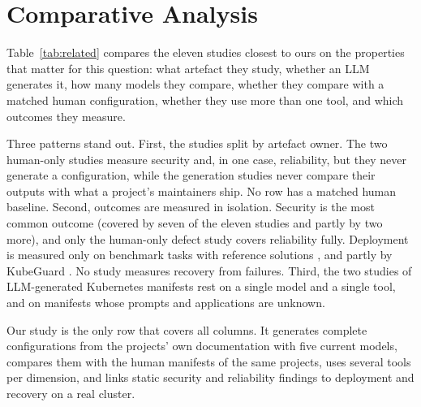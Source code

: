 \section{Comparative Analysis}\label{sec:comparative}

Table~\ref{tab:related} compares the eleven studies closest to ours on the properties that matter for this question: what artefact they study, whether an LLM generates it, how many models they compare, whether they compare with a matched human configuration, whether they use more than one tool, and which outcomes they measure.

Three patterns stand out. First, the studies split by artefact owner. The two human-only studies \citep{rahman2023k8smisconfig,zhang2026k8sconfigdefects} measure security and, in one case, reliability, but they never generate a configuration, while the generation studies never compare their outputs with what a project's maintainers ship. No row has a matched human baseline. Second, outcomes are measured in isolation. Security is the most common outcome (covered by seven of the eleven studies and partly by two more), and only the human-only defect study covers reliability fully. Deployment is measured only on benchmark tasks with reference solutions \citep{xu2024cloudevalyaml,zhang2026iacgen,ding2026fdebench}, and partly by KubeGuard \citep{sgancohen2025kubeguard}. No study measures recovery from failures. Third, the two studies of LLM-generated Kubernetes manifests \citep{zhang2024genaismells,jcomsec2026aivshumank8s} rest on a single model and a single tool, and on manifests whose prompts and applications are unknown.

Our study is the only row that covers all columns. It generates complete configurations from the projects' own documentation with five current models, compares them with the human manifests of the same projects, uses several tools per dimension, and links static security and reliability findings to deployment and recovery on a real cluster.

